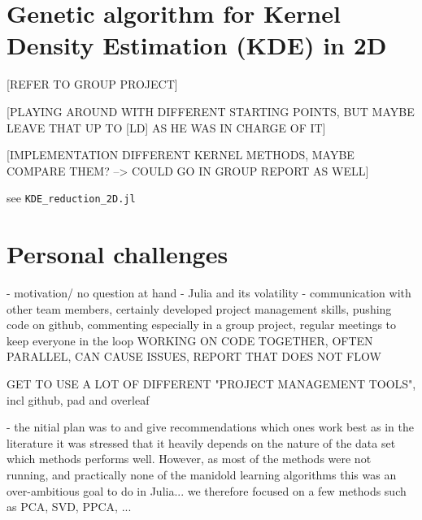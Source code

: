 \documentclass[journal, a4paper]{IEEEtran}
\begin{document}
%
%
%
%
%
%
%
%


\section{Genetic algorithm for Kernel Density Estimation (KDE) in 2D}

[REFER TO GROUP PROJECT]

[PLAYING AROUND WITH DIFFERENT STARTING POINTS, BUT MAYBE LEAVE THAT UP TO [LD] AS HE WAS IN CHARGE OF IT]

[IMPLEMENTATION DIFFERENT KERNEL METHODS, MAYBE COMPARE THEM? --> COULD GO IN GROUP REPORT AS WELL]

see \texttt{KDE\_reduction\_2D.jl}

\section{Personal challenges}

- motivation/ no question at hand
- Julia and its volatility
- communication with other team members, certainly developed project management skills, 
pushing code on github, commenting especially in a group project,
regular meetings to keep everyone in the loop
WORKING ON CODE TOGETHER, OFTEN PARALLEL, CAN CAUSE ISSUES,
REPORT THAT DOES NOT FLOW

GET TO USE A LOT OF DIFFERENT "PROJECT MANAGEMENT TOOLS", incl github, pad and overleaf

- the nitial plan was to and give recommendations which ones work best as in the literature it was stressed that it heavily depends on the nature of the data set which methods performs well. However, as most of the methods were not running, and practically none of the manidold learning algorithms this was an over-ambitious goal to do in Julia...
we therefore focused on a few methods such as PCA, SVD, PPCA, ...
\end{document}

